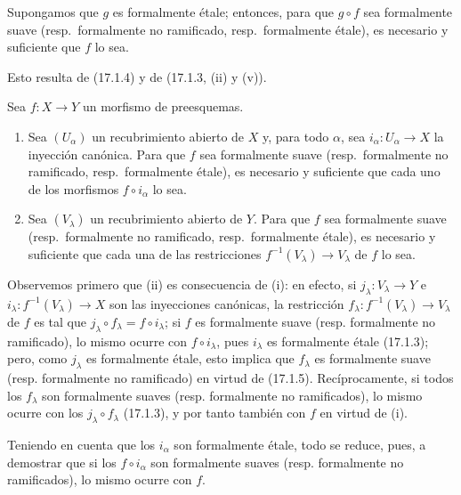 \begin{corollary}[17.1.5]
\label{IV.17.1.5}
Supongamos que $g$ es formalmente étale; entonces, para que $g\circ f$ sea formalmente suave \textup{(resp.}\ formalmente no ramificado, \textup{resp.}\ formalmente étale\textup{)}, es necesario y suficiente que $f$ lo sea.
\end{corollary}

Esto resulta de (17.1.4) y de (17.1.3, (ii) y (v)).

\begin{proposition}[17.1.6]
\label{IV.17.1.6}
Sea $f:X\to Y$ un morfismo de preesquemas.
\begin{enumerate}
  \item[\textup{(i)}] Sea $(U_\alpha)$ un recubrimiento abierto de $X$ y, para todo $\alpha$, sea $i_\alpha:U_\alpha\to X$ la inyección canónica. Para que $f$ sea formalmente suave \textup{(resp.}\ formalmente no ramificado, \textup{resp.}\ formalmente étale\textup{)}, es necesario y suficiente que cada uno de los morfismos $f\circ i_\alpha$ lo sea.
  \item[\textup{(ii)}] Sea $(V_\lambda)$ un recubrimiento abierto de $Y$. Para que $f$ sea formalmente suave \textup{(resp.}\ formalmente no ramificado, \textup{resp.}\ formalmente étale\textup{)}, es necesario y suficiente que cada una de las restricciones $f^{-1}(V_\lambda)\to V_\lambda$ de $f$ lo sea.
\end{enumerate}
\end{proposition}

Observemos primero que (ii) es consecuencia de (i): en efecto, si $j_\lambda:V_\lambda\to Y$ e $i_\lambda:f^{-1}(V_\lambda)\to X$ son las inyecciones canónicas, la restricción $f_\lambda:f^{-1}(V_\lambda)\to V_\lambda$ de $f$ es tal que $j_\lambda\circ f_\lambda=f\circ i_\lambda$; si $f$ es formalmente suave (resp. formalmente no ramificado), lo mismo ocurre con $f\circ i_\lambda$, pues $i_\lambda$ es formalmente étale (17.1.3); pero, como $j_\lambda$ es formalmente étale, esto implica que $f_\lambda$ es formalmente suave (resp. formalmente no ramificado) en virtud de (17.1.5). Recíprocamente, si todos los $f_\lambda$ son formalmente suaves (resp. formalmente no ramificados), lo mismo ocurre con los $j_\lambda\circ f_\lambda$ (17.1.3), y por tanto también con $f$ en virtud de (i).

Teniendo en cuenta que los $i_\alpha$ son formalmente étale, todo se reduce, pues, a demostrar que si los $f\circ i_\alpha$ son formalmente suaves (resp. formalmente no ramificados), lo mismo ocurre con $f$.

